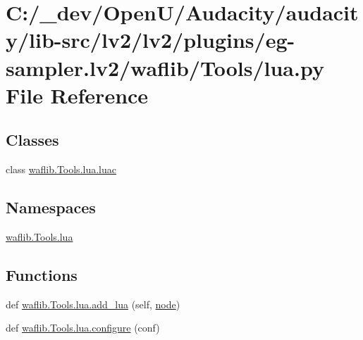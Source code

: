 \hypertarget{lv2_2plugins_2eg-sampler_8lv2_2waflib_2_tools_2lua_8py}{}\section{C\+:/\+\_\+dev/\+Open\+U/\+Audacity/audacity/lib-\/src/lv2/lv2/plugins/eg-\/sampler.lv2/waflib/\+Tools/lua.py File Reference}
\label{lv2_2plugins_2eg-sampler_8lv2_2waflib_2_tools_2lua_8py}
\subsection*{Classes}
\begin{DoxyCompactItemize}
\item 
class \hyperlink{classwaflib_1_1_tools_1_1lua_1_1luac}{waflib.\+Tools.\+lua.\+luac}
\end{DoxyCompactItemize}
\subsection*{Namespaces}
\begin{DoxyCompactItemize}
\item 
 \hyperlink{namespacewaflib_1_1_tools_1_1lua}{waflib.\+Tools.\+lua}
\end{DoxyCompactItemize}
\subsection*{Functions}
\begin{DoxyCompactItemize}
\item 
def \hyperlink{namespacewaflib_1_1_tools_1_1lua_a68e603a9eb9ca00ea36ac02d5fd4e360}{waflib.\+Tools.\+lua.\+add\+\_\+lua} (self, \hyperlink{structnode}{node})
\item 
def \hyperlink{namespacewaflib_1_1_tools_1_1lua_a5419673a215f8866f529e47be9f846e5}{waflib.\+Tools.\+lua.\+configure} (conf)
\end{DoxyCompactItemize}
